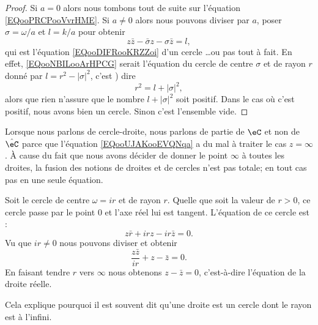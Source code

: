 \begin{proof}
	Si \( a=0\) alors nous tombons tout de suite sur l'équation \eqref{EQooPRCPooVvrHME}. Si \( a\neq 0\) alors nous pouvons diviser par \( a\), poser \( \sigma=\omega/a\) et \( l=k/a\) pour obtenir
	\begin{equation}        \label{EQooNBILooArHPCG}
		z\bar z-\bar\sigma z-\sigma\bar z=l,
	\end{equation}
	qui est l'équation \eqref{EQooDIFRooKRZZoi} d'un cercle \ldots ou pas tout à fait. En effet, \eqref{EQooNBILooArHPCG} serait l'équation du cercle de centre \( \sigma\) et de rayon \( r\) donné par \( l=r^2-| \sigma |^2\), c'est ) dire
	\begin{equation}
		r^2=l+| \sigma |^2,
	\end{equation}
	alors que rien n'assure que le nombre \( l+| \sigma |^2\) soit positif. Dans le cas où c'est positif, nous avons bien un cercle. Sinon c'est l'ensemble vide.
\end{proof}

\begin{remark}      \label{REMooBMAEooHDvNID}
	Lorsque nous parlons de cercle-droite, nous parlons de partie de \( \eC\) et non de \( \hat \eC\) parce que l'équation \eqref{EQooUJAKooEVQNqa} a du mal à traiter le cas \( z=\infty\). À cause du fait que nous avons décider de donner le point \( \infty\) à toutes les droites, la fusion des notions de droites et de cercles n'est pas totale; en tout cas pas en une seule équation.
\end{remark}

\begin{example}      \label{EXooKFBIooOJKjGL}
	Soit le cercle de centre \( \omega=ir\) et de rayon \( r\). Quelle que soit la valeur de \( r>0\), ce cercle passe par le point \( 0\) et l'axe réel lui est tangent. L'équation de ce cercle est :
	\begin{equation}
		z\bar r+irz-ir\bar z=0.
	\end{equation}
	Vu que \( ir\neq 0\) nous pouvons diviser et obtenir
	\begin{equation}
		\frac{ z\bar z }{ ir }+z-\bar z=0.
	\end{equation}
	En faisant tendre \( r\) vers \( \infty\) nous obtenons \( z-\bar z=0\), c'est-à-dire l'équation de la droite réelle.

	Cela explique pourquoi il est souvent dit qu'une droite est un cercle dont le rayon est à l'infini.
\end{example}

